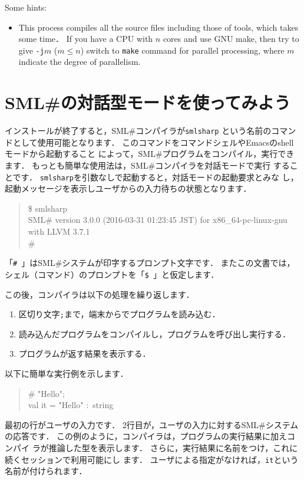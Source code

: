 \documentclass{jbook}
\newif\ifjp
\newcommand{\txt}[2]{#1}
\newcommand{\smlsharp}{SML\#}
\newcommand{\version}{3.0.0}
\newcommand{\releaseDate}{2016-03-31 01:23:45 JST}
\begin{document}
Some hints:
\begin{itemize}
\item 
	This process compiles all the source files including those of
tools, which takes some time．
	If you have a CPU with $n$ cores and use GNU make, then try to
give {\tt -j$m$} ($m \le n$) switch to {\tt make} command for
parallel processing, where $m$ indicate the degree of parallelism. 
\end{itemize}
\fi%

\section{
\txt{\smlsharp{}の対話型モードを使ってみよう}
    {Let's try \smlsharp{} interactive mode}}
\label{sec:tutorialInteractive}

\ifjp%

	インストールが終了すると，\smlsharp{}コンパイラが{\tt smlsharp}
という名前のコマンドとして使用可能となります．
	このコマンドをコマンドシェルやEmacsのshellモードから起動すること
によって，\smlsharp{}プログラムをコンパイル，実行できます．
	もっとも簡単な使用法は，\smlsharp{}コンパイラを対話モードで実行
することです．
	{\tt smlsharp}を引数なしで起動すると，対話モードの起動要求とみな
し，起動メッセージを表示しユーザからの入力待ちの状態となります．
\begin{tt}
\begin{quote}
\$ smlsharp\\
SML\# version \version{} (\releaseDate{}) for x86\_64-pc-linux-gnu with LLVM 3.7.1\\
\# 
\end{quote}
\end{tt}
	「{\tt \#\ }」は\smlsharp{}システムが印字するプロンプト文字です． 
	またこの文書では，シェル（コマンド）のプロンプトを「{\tt \$\ }」と仮定します．

	この後，コンパイラは以下の処理を繰り返します．
\begin{enumerate}
\item 区切り文字{\tt ;}まで，端末からでプログラムを読み込む．
\item 読み込んだプログラムをコンパイルし，プログラムを呼び出し実行する．
\item プログラムが返す結果を表示する．
\end{enumerate}
	以下に簡単な実行例を示します．
\begin{tt}
\begin{quote}
\# "Hello";\\
val it = "Hello" :~string
\end{quote}
\end{tt}
	最初の行がユーザの入力です．
	2行目が，ユーザの入力に対する\smlsharp{}システムの応答です．
	この例のように，コンパイラは，プログラムの実行結果に加えコンパイ
ラが推論した型を表示します．
	さらに，実行結果に名前をつけ，これに続くセッションで利用可能にし
ます．
	ユーザによる指定がなければ，{\tt it}という名前が付けられます．
\else%
\end{document}

